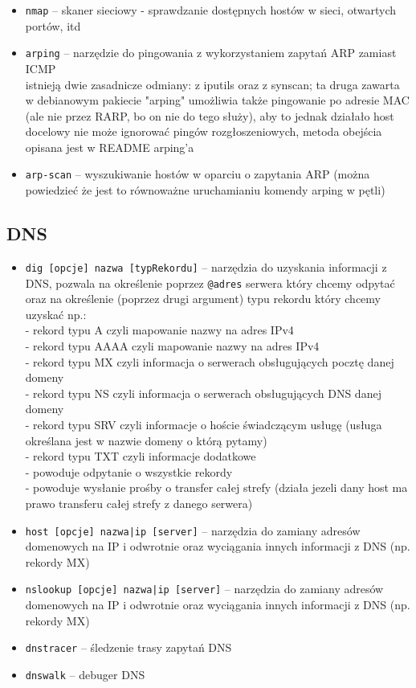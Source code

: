 \documentclass{pdfBooklets}
\begin{document}
\begin{itemize}
	\item \Verb#nmap# –
		skaner sieciowy - sprawdzanie dostępnych hostów w sieci, otwartych portów, itd
	\item \Verb#arping# –
		narzędzie do pingowania z wykorzystaniem zapytań ARP zamiast ICMP\\
		istnieją dwie zasadnicze odmiany: z iputils oraz z synscan; ta druga zawarta w debianowym pakiecie "arping" umożliwia także pingowanie po adresie MAC (ale nie przez RARP, bo on nie do tego służy), aby to jednak działało host docelowy nie może ignorować pingów rozgłoszeniowych, metoda obejścia opisana jest w README arping'a
	
	\item \Verb#arp-scan# –
		wyszukiwanie hostów w oparciu o zapytania ARP (można powiedzieć że jest to równoważne uruchamianiu komendy arping w pętli)
\end{itemize}

\subsection{DNS}
\begin{itemize}
	\item \Verb#dig [opcje] nazwa [typRekordu]# –
		narzędzia do uzyskania informacji z DNS,
		pozwala na określenie poprzez \Verb#@adres# serwera który chcemy odpytać oraz na określenie (poprzez drugi argument) typu rekordu który chcemy uzyskać np.:\\
			\Verb@A@ - rekord typu A czyli mapowanie nazwy na adres IPv4\\
			\Verb@AAAA@ - rekord typu AAAA czyli mapowanie nazwy na adres IPv4\\
			\Verb@MX@ - rekord typu MX czyli informacja o serwerach obsługujących pocztę danej domeny\\
			\Verb@NS@ - rekord typu NS czyli informacja o serwerach obsługujących DNS danej domeny\\
			\Verb@SRV@ - rekord typu SRV czyli informacje o hoście świadczącym usługę (usługa określana jest w nazwie domeny o którą pytamy)\\
			\Verb@TXT@ - rekord typu TXT czyli informacje dodatkowe\\
			\Verb@ANY@ - powoduje odpytanie o wszystkie rekordy\\
			\Verb@AXFR@ - powoduje wysłanie prośby o transfer całej strefy (działa jezeli dany host ma prawo transferu całej strefy z danego serwera)
	
	\item \Verb#host [opcje] nazwa|ip [server]# –
		narzędzia do zamiany adresów domenowych na IP i odwrotnie oraz wyciągania innych informacji z DNS (np. rekordy MX)
	\item \Verb#nslookup [opcje] nazwa|ip [server]# –
		narzędzia do zamiany adresów domenowych na IP i odwrotnie oraz wyciągania innych informacji z DNS (np. rekordy MX)
	
	\item \Verb#dnstracer# –
		śledzenie trasy zapytań DNS
	\item \Verb#dnswalk# –
		debuger DNS
\end{itemize}
\end{document}
